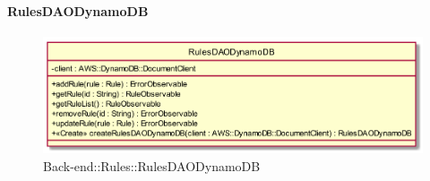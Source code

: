 \hypertarget{RulesDAODynamoDB_label}{\paragraph{RulesDAODynamoDB}}
\begin{figure}[h]
	\centering
	\includegraphics[width=\textwidth,height=\textheight,keepaspectratio]{images/ClassRulesDAODynamoDB.png}
	\caption{Back-end::Rules::RulesDAODynamoDB}
\end{figure}
